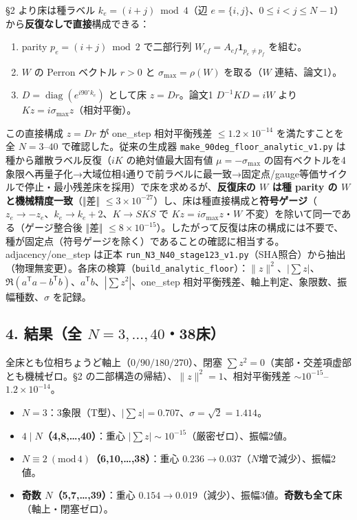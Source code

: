 \documentclass[
  a4paper,
]{ltjsarticle}
\providecommand{\tightlist}{%
  \setlength{\itemsep}{0pt}\setlength{\parskip}{0pt}}
\begin{document}
§2 より床は種ラベル \(k_e=(i+j)\bmod4\)（辺
\(e=\{i,j\}\)、\(0\le i<j\le N-1\)）から\textbf{反復なしで直接}構成できる：

\begin{enumerate}
\def\labelenumi{\arabic{enumi}.}
\tightlist
\item
  parity \(p_e=(i+j)\bmod2\) で二部行列
  \(W_{ef}=A_{ef}\mathbf 1_{p_e\neq p_f}\) を組む。
\item
  \(W\) の Perron ベクトル \(r>0\) と \(\sigma_{\max}=\rho(W)\)
  を取る（\(W\) 連結、論文1）。
\item
  \(D=\operatorname{diag}(e^{i90^\circ k_e})\) として床 \(z=Dr\)。論文1
  \(D^{-1}KD=iW\) より \(Kz=i\sigma_{\max}z\)（相対平衡）。
\end{enumerate}

この直接構成 \(z=Dr\) が one\_step 相対平衡残差 \(\le1.2\times10^{-14}\)
を満たすことを全 \(N=3\)--\(40\) で確認した。従来の生成器
\texttt{make\_90deg\_floor\_analytic\_v1.py}
は種から離散ラベル反復（\(iK\) の絶対値最大固有値 \(\mu=-\sigma_{\max}\)
の固有ベクトルを4象限へ再量子化→大域位相4通りで前ラベルに最一致→固定点/gauge等価サイクルで停止・最小残差床を採用）で床を求めるが、\textbf{反復床の
\(W\) は種 parity の \(W\) と機械精度一致}（‖差‖
\(\le3\times10^{-27}\)）し、床は種直接構成と\textbf{符号ゲージ}（\(z_e\to-z_e\)、\(k_e\to k_e+2\)、\(K\to SKS\)
で \(Kz=i\sigma_{\max}z\)・\(W\) 不変）を除いて同一である（ゲージ整合後
‖差‖
\(\le8\times10^{-15}\)）。したがって反復は床の構成には不要で、種が固定点（符号ゲージを除く）であることの確認に相当する。adjacency/one\_step
は正本
\texttt{run\_N3\_N40\_stage123\_v1.py}（SHA照合）から抽出（物理無変更）。各床の検算（\texttt{build\_analytic\_floor}）：\(\|z\|^2\)、\(|\sum z|\)、\(\Re(a^{\mathsf T}a-b^{\mathsf T}b)\)、\(a^{\mathsf T}b\)、\(|\sum z^2|\)、one\_step
相対平衡残差、軸上判定、象限数、振幅種数、\(\sigma\) を記録。

\subsection{\texorpdfstring{4. 結果（全
\(N=3,\ldots,40\)・38床）}{4. 結果（全 N=3,\textbackslash ldots,40・38床）}}\label{ux7d50ux679cux5168-n3ldots4038ux5e8a}

全床とも位相ちょうど軸上（\(0/90/180/270\)）、閉塞
\(\sum z^2=0\)（実部・交差項虚部とも機械ゼロ。§2
の二部構造の帰結）、\(\|z\|^2=1\)、相対平衡残差
\(\sim10^{-15}\)--\(1.2\times10^{-14}\)。

\begin{itemize}
\tightlist
\item
  \textbf{\(N=3\)}：3象限（T型）、\(|\sum z|=0.707\)、\(\sigma=\sqrt2=1.414\)。
\item
  \textbf{\(4\mid N\)（4,8,\ldots,40）}：重心
  \(|\sum z|\sim10^{-15}\)（厳密ゼロ）、振幅2値。
\item
  \textbf{\(N\equiv2\ (\mathrm{mod}\,4)\)（6,10,\ldots,38）}：重心
  \(0.236\to0.037\)（\(N\)増で減少）、振幅2値。
\item
  \textbf{奇数 \(N\)（5,7,\ldots,39）}：重心
  \(0.154\to0.019\)（減少）、振幅3値。\textbf{奇数も全て床}（軸上・閉塞ゼロ）。
\end{itemize}
\end{document}
